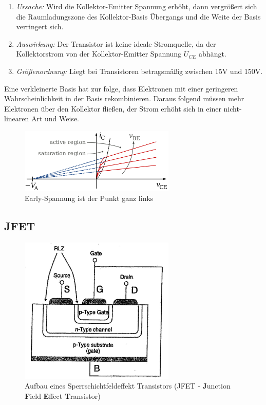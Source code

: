 \begin{enumerate}
    \item \emph{Ursache:} Wird die Kollektor-Emitter Spannung erhöht, dann vergrößert sich die Raumladungszone des Kollektor-Basis Übergangs und die Weite der Basis verringert sich.
    \item \emph{Auswirkung:} Der Transistor ist keine ideale Stromquelle, da der Kollektorstrom von der Kollektor-Emitter Spannung $U_{CE}$ abhängt.
    \item \emph{Größenordnung:} Liegt bei Transistoren betragsmäßig zwischen 15V und 150V. 
\end{enumerate}

Eine verkleinerte Basis hat zur folge, dass Elektronen mit einer geringeren Wahrscheinlichkeit in der Basis rekombinieren.
Daraus folgend müssen mehr Elektronen über den Kollektor fließen, der Strom erhöht sich in einer nicht-linearen Art und Weise. 

    \begin{figure}
        \centering
        \includegraphics[width=0.66\textwidth]{fig/transistor-early-effect.png}
        \caption{Early-Spannung ist der Punkt ganz links}
        \label{fig:npnTransistorKennlinie}
    \end{figure}


\subsection{JFET }\label{k6:jfet}

    \begin{figure}[H]
        \centering
        \includegraphics[width=0.66\textwidth]{fig/jfet-aufbau.jpg}
        \caption{Aufbau eines Sperrschichtfeldeffekt Transistors (JFET - \textbf{J}unction \textbf{F}ield \textbf{E}ffect \textbf{T}ransistor)}
        \label{fig:jfet-aufbau}
    \end{figure}

